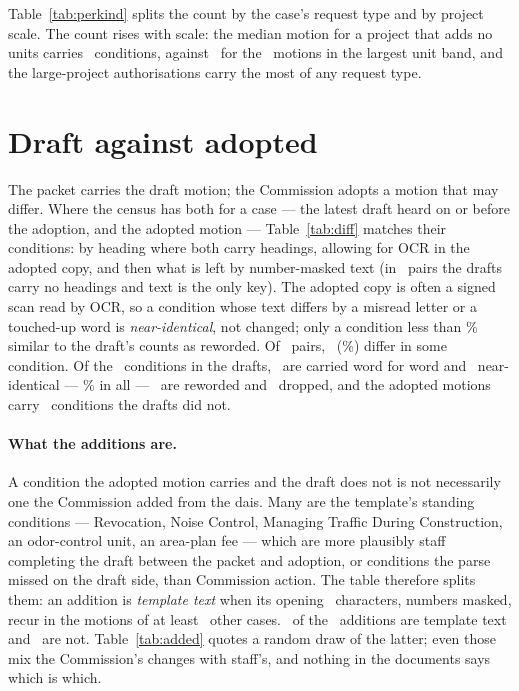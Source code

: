 \documentclass[11pt]{article}
\newcommand{\cctable}[1]{\FloatBarrier\def\cctab{#1}}
\begin{document}
\cctable{peryear}

Table~\ref{tab:perkind} splits the count by the case's request type and by project scale. The
count rises with scale: the median motion for a project that adds no units carries
\ccPerUnitsNoneMed\ conditions, against \ccPerUnitsLargeMed\ for the \ccPerUnitsLargeN\
motions in the largest unit band, and the large-project authorisations carry the most of any
request type.

\cctable{perkind}

\section{Draft against adopted}
\label{sec:diff}

The packet carries the draft motion; the Commission adopts a motion that may differ. Where the
census has both for a case --- the latest draft heard on or before the adoption, and the
adopted motion --- Table~\ref{tab:diff} matches their conditions: by heading where both carry
headings, allowing for OCR in the adopted copy, and then what is left by number-masked text
(in \ccDiffByText\ pairs the drafts carry no headings and text is the only key). The adopted
copy is often a signed scan read by OCR, so a condition whose text differs by a misread letter
or a touched-up word is \emph{near-identical}, not changed; only a condition less than
\ccDiffSame\% similar to the draft's counts as reworded. Of \ccDiffPairs\ pairs,
\ccDiffAnyChange\ (\ccDiffAnyChangePct\%) differ in some condition. Of the \ccDiffDraftConds\
conditions in the drafts, \ccDiffIdentical\ are carried word for word and \ccDiffNear\
near-identical --- \ccDiffCarriedPct\% in all --- \ccDiffChanged\ are reworded and
\ccDiffRemoved\ dropped, and the adopted motions carry \ccDiffAdded\ conditions the drafts did
not.

\paragraph{What the additions are.} A condition the adopted motion carries and the draft does
not is not necessarily one the Commission added from the dais. Many are the template's standing
conditions --- Revocation, Noise Control, Managing Traffic During Construction, an odor-control
unit, an area-plan fee --- which are more plausibly staff completing the draft between the packet
and adoption, or conditions the parse missed on the draft side, than Commission action. The
table therefore splits them: an addition is \emph{template text} when its opening
\ccDiffTemplateChars\ characters, numbers masked, recur in the motions of at least
\ccDiffTemplateCases\ other cases. \ccDiffAddedTemplate\ of the \ccDiffAdded\ additions are
template text and \ccDiffAddedOther\ are not. Table~\ref{tab:added} quotes a random draw of the
latter; even those mix the Commission's changes with staff's, and nothing in the documents says
which is which.
\end{document}
